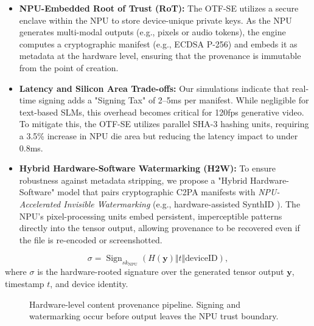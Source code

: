\documentclass[twocolumn,10pt]{article}
\begin{document}
\begin{itemize}
    \item \textbf{NPU-Embedded Root of Trust (RoT):} The OTF-SE utilizes a secure enclave within the NPU to store device-unique private keys. As the NPU generates multi-modal outputs (e.g., pixels or audio tokens), the engine computes a cryptographic manifest (e.g., ECDSA P-256) and embeds it as metadata at the hardware level, ensuring that the provenance is immutable from the point of creation.
    \item \textbf{Latency and Silicon Area Trade-offs:} Our simulations indicate that real-time signing adds a "Signing Tax" of 2--5ms per manifest. While negligible for text-based SLMs, this overhead becomes critical for 120fps generative video. To mitigate this, the OTF-SE utilizes parallel SHA-3 hashing units, requiring a 3.5\% increase in NPU die area but reducing the latency impact to under 0.8ms.
    \item \textbf{Hybrid Hardware-Software Watermarking (H2W):} To ensure robustness against metadata stripping, we propose a "Hybrid Hardware-Software" model that pairs cryptographic C2PA manifests with \textit{NPU-Accelerated Invisible Watermarking} (e.g., hardware-assisted SynthID \cite{synthid_2024}). The NPU's pixel-processing units embed persistent, imperceptible patterns directly into the tensor output, allowing provenance to be recovered even if the file is re-encoded or screenshotted.
\end{itemize}
\begin{equation}
\sigma=\operatorname{Sign}_{sk_{\mathrm{NPU}}}
\left(H(\mathbf{y})\Vert t\Vert \mathrm{deviceID}\right),
\label{eq:provenance_signature}
\end{equation}
where $\sigma$ is the hardware-rooted signature over the generated tensor output $\mathbf{y}$, timestamp $t$, and device identity.

\begin{figure}[t]
\centering
{}
\caption{Hardware-level content provenance pipeline. Signing and watermarking occur before output leaves the NPU trust boundary.}
\label{fig:provenance}
\end{figure}
\end{document}
